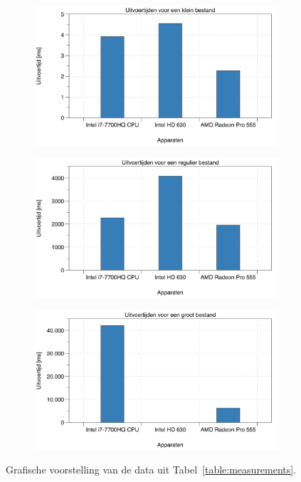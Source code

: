 \documentclass[twocolumn, a4paper]{article}
\begin{document}
\begin{figure}
    \centering
    \begin{subfigure}{0.5\textwidth}
        \includegraphics[width=\textwidth]{data/klein.png}
    \end{subfigure}
    \begin{subfigure}{0.5\textwidth}
        \includegraphics[width=\textwidth]{data/normaal.png}
    \end{subfigure}
    \begin{subfigure}{0.5\textwidth}
        \includegraphics[width=\textwidth]{data/groot.png}
    \end{subfigure}
    \caption{Grafische voorstelling van de data uit Tabel~\ref{table:measurements}.}\label{fig:images}
\end{figure}
\end{document}
